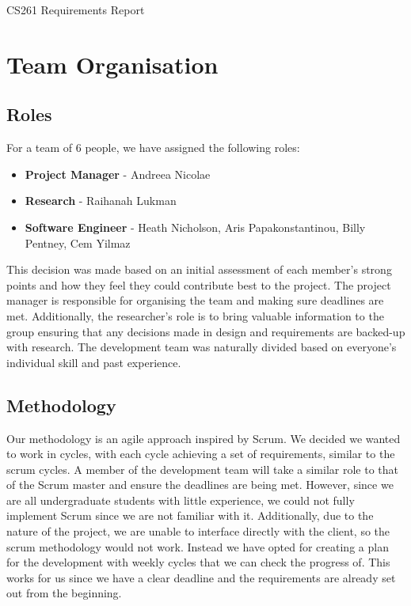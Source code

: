\documentclass[a4paper]{article}
\theoremstyle{plain}
\theoremstyle{definition}
\theoremstyle{remark}
\begin{document}
\hline
\begin{center}
	\vspace{1mm}
	\Huge CS261 Requirements Report
\end{center}
\hline
\section*{Team Organisation}
\subsection*{Roles}
For a team of 6 people, we have assigned the following roles:
\begin{itemize}
	\item \textbf{Project Manager} - Andreea Nicolae 
	\item \textbf{Research} - Raihanah Lukman
	\item \textbf{Software Engineer} - Heath Nicholson, Aris Papakonstantinou, Billy Pentney, Cem Yilmaz
\end{itemize}
This decision was made based on an initial assessment of each member’s strong points and how they feel they could contribute best to the project. The project manager is responsible for organising the team and making sure deadlines are met. Additionally, the researcher’s role is to bring valuable information to the group ensuring that any decisions made in design and requirements are backed-up with research. The development team was naturally divided based on everyone’s individual skill and past experience.
\subsection*{Methodology}
Our methodology is an agile approach inspired by Scrum. We decided we wanted to work in cycles, with each cycle achieving a set of requirements, similar to the scrum cycles. A member of the development team will take a similar role to that of the Scrum master and ensure the deadlines are being met. However, since we are all undergraduate students with little experience, we could not fully implement Scrum since we are not familiar with it. Additionally, due to the nature of the project, we are unable to interface directly with the client, so the scrum methodology would not work. Instead we have opted for creating a plan for the development with weekly cycles that we can check the progress of. This works for us since we have a clear deadline and the requirements are already set out from the beginning. \\
\end{document}

